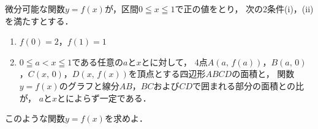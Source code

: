 \documentclass[../../main.tex]{subfiles}
\begin{document}
微分可能な関数$y=f(x)$が，区間$0 \leqq x \leqq 1$で正の値をとり，
次の2条件(i)，(ii)を満たすとする．
\begin{enumerate}
  \item[(i)] $f(0)=2$，$f(1)=1$
  \item[(ii)] $0 \leqq a < x \leqq 1$である任意の$a$と$x$とに対して，
    4点$A(a, \, f(a))$，$B(a, \, 0)$，$C(x, \, 0)$，$D(x, \, f(x))$を頂点とする四辺形$ABCD$の面積と，
    関数$y=f(x)$のグラフと線分$AB$，$BC$および$CD$で囲まれる部分の面積との比が，
    $a$と$x$とによらず一定である．
\end{enumerate}
このような関数$y=f(x)$を求めよ．
\end{document}
